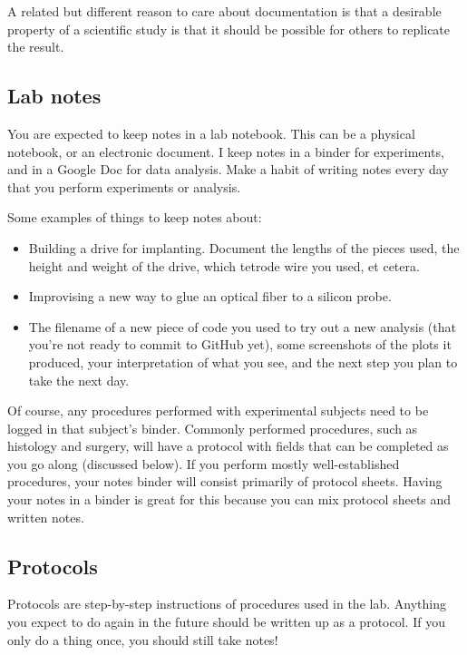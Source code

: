 \documentclass{tufte-book}
\begin{document}
A related but different reason to care about documentation is that a
desirable property of a scientific study is that it should be possible
for others to replicate the result.

\subsection{Lab notes}

You are expected to keep notes in a lab notebook. This can be a
physical notebook, or an electronic document. I keep notes in a binder
for experiments, and in a Google Doc for data analysis. Make a habit of writing notes every day that
you perform experiments or analysis.

Some examples of things to keep notes about:

\begin{itemize}
\item{Building a drive for implanting. Document the lengths of the
  pieces used, the height and weight of the drive, which tetrode wire
  you used, et cetera.}
\item{Improvising a new way to glue an optical fiber to a silicon
  probe.}
\item{The filename of a new piece of code you used to try out a new
  analysis (that you're not ready to commit to GitHub yet), some
  screenshots of the plots it produced, your interpretation of what
  you see, and the next step you plan to take the next day.}
\end{itemize}

Of course, any procedures performed with experimental subjects need to
be logged in that subject's binder. Commonly performed procedures,
such as histology and surgery, will have a protocol with fields that
can be completed as you go along (discussed below). If you perform
mostly well-established procedures, your notes binder will consist
primarily of protocol sheets. Having your notes in a binder is great
for this because you can mix protocol sheets and written notes.

\subsection{Protocols}

Protocols are step-by-step instructions of procedures used in the
lab. Anything you expect to do again in the future should be written
up as a protocol. If you only do a thing once, you should still take
notes!
\end{document}
